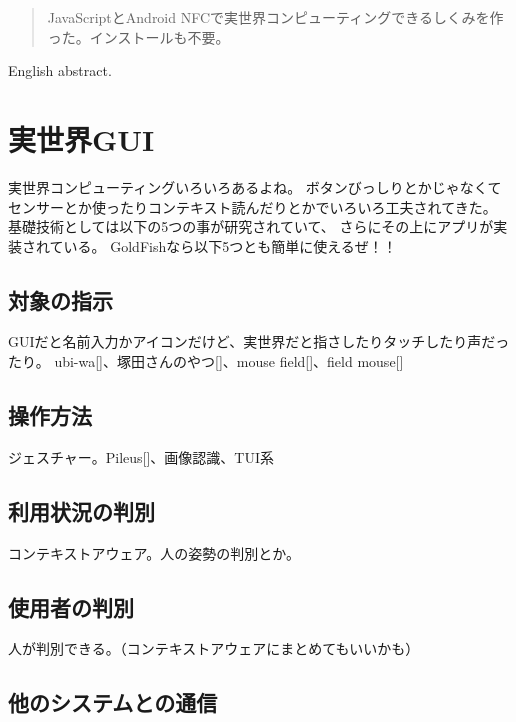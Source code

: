 
\begin{abstract}
JavaScriptとAndroid NFCで実世界コンピューティングできるしくみを作った。インストールも不要。
\end{abstract}

\begin{eabstract}
English abstract.
\end{eabstract}

\maketitle

\section{実世界GUI}\label{sec:Introduction}

実世界コンピューティングいろいろあるよね。
ボタンびっしりとかじゃなくてセンサーとか使ったりコンテキスト読んだりとかでいろいろ工夫されてきた。
基礎技術としては以下の5つの事が研究されていて、
さらにその上にアプリが実装されている。
GoldFishなら以下5つとも簡単に使えるぜ！！


\subsection{対象の指示}
GUIだと名前入力かアイコンだけど、実世界だと指さしたりタッチしたり声だったり。
ubi-wa[]、塚田さんのやつ[]、mouse field[]、field mouse[]

\subsection{操作方法}
ジェスチャー。Pileus[]、画像認識、TUI系

\subsection{利用状況の判別}
コンテキストアウェア。人の姿勢の判別とか。

\subsection{使用者の判別}
人が判別できる。（コンテキストアウェアにまとめてもいいかも）

\subsection{他のシステムとの通信}

